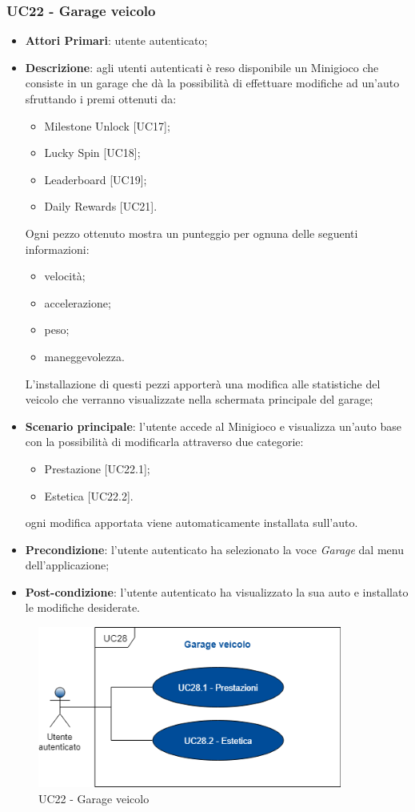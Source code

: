 \subsubsection{UC22 - Garage veicolo}
\begin{itemize}
	\item \textbf{Attori Primari}: utente autenticato;
	\item \textbf{Descrizione}: agli utenti autenticati è reso disponibile un Minigioco che consiste in un garage che dà la possibilità di effettuare modifiche ad un'auto sfruttando i premi ottenuti da:
	\begin{itemize}
		\item Milestone Unlock [UC17];
		\item Lucky Spin [UC18];
		\item Leaderboard [UC19];
		\item Daily Rewards [UC21]. 
	\end{itemize} 
	Ogni pezzo ottenuto mostra un punteggio per ognuna delle seguenti informazioni:
	\begin{itemize}
		\item velocità;
		\item accelerazione;
		\item peso;
		\item maneggevolezza.
	\end{itemize}
	L'installazione di questi pezzi apporterà una modifica alle statistiche del veicolo che verranno visualizzate nella schermata principale del garage;
	\item \textbf{Scenario principale}: l'utente accede al Minigioco e visualizza un'auto base con la possibilità di modificarla attraverso due categorie:
	\begin{itemize}
		\item Prestazione [UC22.1];
		\item Estetica [UC22.2].
	\end{itemize}
	ogni modifica apportata viene automaticamente installata sull'auto.
	\item \textbf{Precondizione}: l'utente autenticato ha selezionato la voce \textit{Garage} dal menu dell'applicazione;
	\item \textbf{Post-condizione}: l'utente autenticato ha visualizzato la sua auto e installato le modifiche desiderate. 
\end{itemize}
\begin{figure}[h]
	\includegraphics[width=10cm]{res/images/UC26-Garage.png}
	\centering
	\caption{UC22 - Garage veicolo}
\end{figure}
\newpage
